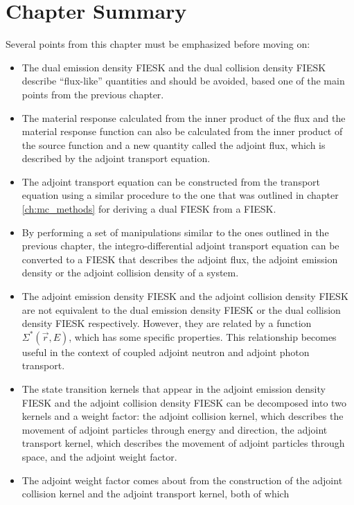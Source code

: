 \section{Chapter Summary}
Several points from this chapter must be emphasized before moving on:
\begin{itemize}
  \item The dual emission density FIESK and the dual collision density FIESK
    describe ``flux-like'' quantities and should be avoided, based one of the 
    main points from the previous chapter.
  \item The material response calculated from the inner product of the flux
    and the material response function can also be calculated from the inner
    product of the source function and a new quantity called the adjoint flux,
    which is described by the adjoint transport equation.
  \item The adjoint transport equation can be constructed from the transport
    equation using a similar procedure to the one that was outlined in 
    chapter \ref{ch:mc_methods} for deriving a dual FIESK from a FIESK.
  \item By performing a set of manipulations similar to the ones outlined in
    the previous chapter, the integro-differential adjoint transport equation
    can be converted to a FIESK that describes the adjoint flux, the adjoint
    emission density or the adjoint collision density of a system.
  \item The adjoint emission density FIESK and the adjoint collision density
    FIESK are not equivalent to the dual emission density FIESK or the dual
    collision density FIESK respectively. However, they are related by a
    function $\Sigma^{*}(\vec{r},E)$, which has some specific properties. This 
    relationship becomes useful in the context of coupled adjoint neutron
    and adjoint photon transport.
  \item The state transition kernels that appear in the adjoint emission
    density FIESK and the adjoint collision density FIESK can be decomposed
    into two kernels and a weight factor: the adjoint collision kernel, which
    describes the movement of adjoint particles through energy and direction,
    the adjoint transport kernel, which describes the movement of adjoint 
    particles through space, and the adjoint weight factor.
  \item The adjoint weight factor comes about from the construction of the
    adjoint collision kernel and the adjoint transport kernel, both of which

\end{itemize}
